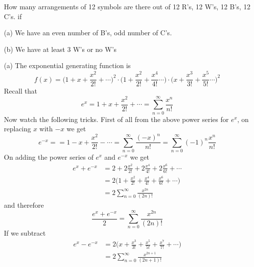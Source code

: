\begin{eg}
How many arrangements of 12 symbols are there out of 12 R's, 12 W's, 12 B's,
12 C's. if

(a) We have an even number of B's, odd number of C's.

(b) We have at least 3 W's or no W's
\end{eg}

(a) The exponential generating function is
\[
f(x) = \biggl( 1 + x + \frac{x^2}{2!} + \cdots \biggr)^2
\cdot 
\biggl( 1 + \frac{x^2}{2!} +  \frac{x^4}{4!} \cdots \biggr)
\cdot 
\biggl( x + \frac{x^3}{3!} +  \frac{x^5}{5!} \cdots \biggr)^2
\]
Recall that
\[
e^x 
= 1 + x + \frac{x^2}{2!} + \cdots  
= \sum_{n=0}^\infty \frac{x^n}{n!}
\]
Now watch the following tricks.
First of all from the above power series for $e^x$,
on replacing $x$ with $-x$ we get
\[
e^{-x} = 
= 1 - x + \frac{x^2}{2!} - \cdots  
= \sum_{n=0}^\infty \frac{(-x)^n}{n!}
= \sum_{n=0}^\infty (-1)^n \frac{x^n}{n!}
\]
On adding the power series of $e^x$ and $e^{-x}$ we get
\begin{align*}
e^x + e^{-x} 
&= 2 + 2 \frac{x^2}{2!} + 2 \frac{x^4}{4!} + 2 \frac{x^6}{6!} + \cdots \\
&= 2 \biggl( 
   1 + \frac{x^2}{2!} + \frac{x^4}{4!} + \frac{x^6}{6!} + \cdots \biggr) \\
&= 2 \sum_{n=0}^\infty \frac{x^{2n}}{(2n)!}
\end{align*}
and therefore
\[
\frac{e^x + e^{-x}}{2} 
=  \sum_{n=0}^\infty \frac{x^{2n}}{(2n)!}
\]
If we subtract 
\begin{align*}
e^x - e^{-x} 
&= 2 \biggl( 
   x + \frac{x^3}{3!} + \frac{x^5}{5!} + \frac{x^7}{7!} + \cdots \biggr) \\
&= 2 \sum_{n=0}^\infty \frac{x^{2n+1}}{(2n+1)!}
\end{align*}

